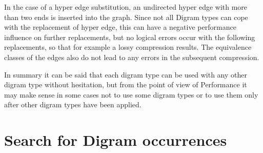 \documentclass[a4paper]{scrartcl}
\begin{document}
In the case of a hyper edge substitution, an undirected hyper edge with more than two ends is inserted into the graph. Since not all Digram types can cope with the replacement of hyper edge, this can have a negative performance influence on further replacements, but no logical errors occur with the following replacements, so that for example a lossy compression results. The equivalence classes of the edges also do not lead to any errors in the subsequent compression.

In summary it can be said that each digram type can be used with any other digram type without hesitation, but from the point of view of Performance it may make sense in some cases not to use some digram types or to use them only after other digram types have been applied.

\section{Search for Digram occurrences}


\end{document}
